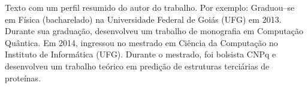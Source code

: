 
\begin{perfil}
Texto com um perfil resumido do autor do trabalho. Por exemplo: Graduou--se em Física (bacharelado) na Universidade Federal de Goiás (UFG) em 2013. Durante sua graduação, desenvolveu um trabalho de monografia em Computação Quântica. Em 2014, ingressou no mestrado em Ciência da Computação no Instituto de Informática (UFG). Durante o mestrado, foi bolsista CNPq e desenvolveu um trabalho teórico em predição de estruturas terciárias de proteínas.
\end{perfil}